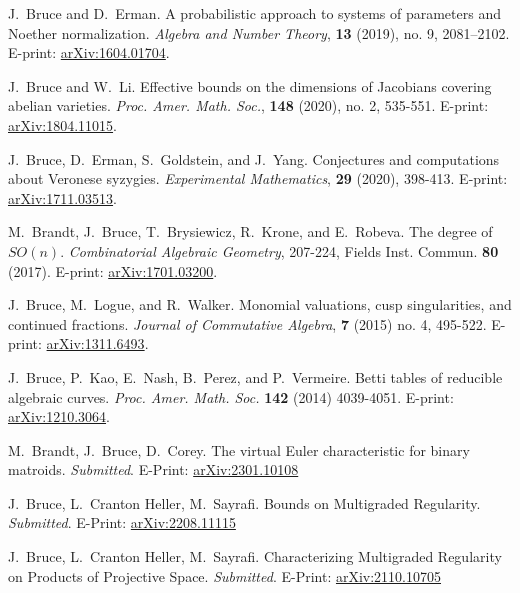 \documentclass[letterpaper,11pt]{article}
\newcommand{\resheading}[1]{\vspace{8pt}
  \parbox{\textwidth}{\setlength{\FrameSep}{\fboxsep}
    \begin{shaded}
\setlength{\fboxsep}{0pt}\framebox[\textwidth][l]{\setlength{\fboxsep}{4pt}\fcolorbox{shadecolorB}{shadecolorB}{\textbf{\sffamily{\mbox{~}\makebox[6.762in][l]{\large #1} \vphantom{p\^{E}}}}}}
    \end{shaded}
  }\vspace{-5pt}
}
\begin{document}
\begin{revnumerate}[15]
\item
	J.~Bruce and D.~Erman. A probabilistic approach to systems of parameters and Noether normalization. {\it Algebra and Number Theory}, \textbf{13} (2019), no. 9, 2081–2102. E-print: \hyperref{http://arxiv.org/abs/1604.01704}{}{}{arXiv:1604.01704}.
	
\item
	J.~Bruce and W.~Li. Effective bounds on the dimensions of Jacobians covering abelian varieties.  {\it Proc. Amer. Math. Soc.}, \textbf{148} (2020), no. 2, 535-551. E-print: \hyperref{https://arxiv.org/abs/1804.11015}{}{}{arXiv:1804.11015}.
			
\item
	J.~Bruce, D.~Erman, S.~Goldstein, and J.~Yang. Conjectures and computations about Veronese syzygies.  {\it Experimental Mathematics}, \textbf{29} (2020), 398-413. E-print: \hyperref{https://arxiv.org/abs/1711.03513}{}{}{arXiv:1711.03513}.
	
\item
	M.~Brandt, J.~Bruce, T.~Brysiewicz, R.~Krone, and E.~Robeva. The degree of $SO(n)$. {\it Combinatorial Algebraic Geometry}, 207-224, Fields Inst. Commun. \textbf{80} (2017). E-print: \hyperref{https://arxiv.org/abs/1701.03200}{}{}{arXiv:1701.03200}.
	
\item
	J.~Bruce, M.~Logue, and R.~Walker. Monomial valuations, cusp singularities, and continued fractions. {\it Journal of Commutative Algebra}, \textbf{7} (2015) no. 4, 495-522. E-print: \hyperref{http://arxiv.org/abs/1311.6493}{}{}{arXiv:1311.6493}.

\item
	J.~Bruce, P.~Kao, E.~Nash, B.~Perez, and P.~Vermeire. Betti tables of reducible algebraic curves. {\it Proc. Amer. Math. Soc.} \textbf{142} (2014) 4039-4051. E-print: \hyperref{http://arxiv.org/abs/1210.3064}{}{}{arXiv:1210.3064}.
\end{revnumerate}

\resheading{Pre-Prints}

\begin{revnumerate}

\item
	M.~Brandt, J.~Bruce, D.~Corey. The virtual Euler characteristic for binary matroids. {\it Submitted}. E-Print: \hyperref{https://arxiv.org/abs/2301.10108}{}{}{arXiv:2301.10108}
	
\item
	J.~Bruce, L.~Cranton Heller, M.~Sayrafi. Bounds on Multigraded Regularity.  {\it Submitted}. E-Print: \hyperref{https://arxiv.org/abs/2208.11115}{}{}{arXiv:2208.11115}
	
\item
	J.~Bruce, L.~Cranton Heller, M.~Sayrafi. Characterizing Multigraded Regularity on Products of Projective Space.  {\it Submitted}. E-Print:  \hyperref{https://arxiv.org/abs/2110.10705}{}{}{arXiv:2110.10705}	

\end{revnumerate}
\end{document}
